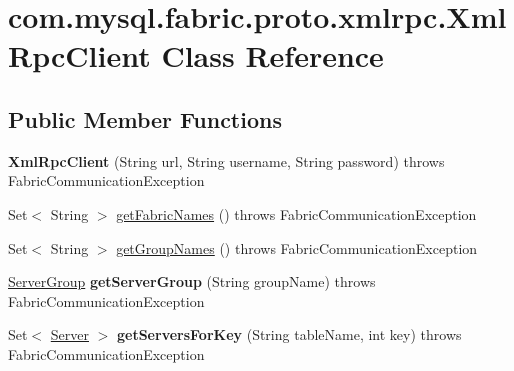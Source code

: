 \hypertarget{classcom_1_1mysql_1_1fabric_1_1proto_1_1xmlrpc_1_1_xml_rpc_client}{}\section{com.\+mysql.\+fabric.\+proto.\+xmlrpc.\+Xml\+Rpc\+Client Class Reference}
\label{classcom_1_1mysql_1_1fabric_1_1proto_1_1xmlrpc_1_1_xml_rpc_client}
\subsection*{Public Member Functions}
\begin{DoxyCompactItemize}
\item 
\mbox{\label{classcom_1_1mysql_1_1fabric_1_1proto_1_1xmlrpc_1_1_xml_rpc_client_aca70274d71b6242a02d406f727f58428}} 
{\bfseries Xml\+Rpc\+Client} (String url, String username, String password)  throws Fabric\+Communication\+Exception 
\item 
Set$<$ String $>$ \mbox{\hyperlink{classcom_1_1mysql_1_1fabric_1_1proto_1_1xmlrpc_1_1_xml_rpc_client_a61a79c49069ab6e664bbca2f37fe7813}{get\+Fabric\+Names}} ()  throws Fabric\+Communication\+Exception 
\item 
Set$<$ String $>$ \mbox{\hyperlink{classcom_1_1mysql_1_1fabric_1_1proto_1_1xmlrpc_1_1_xml_rpc_client_a553477c453b6790f351a0b0b21bf5947}{get\+Group\+Names}} ()  throws Fabric\+Communication\+Exception 
\item 
\mbox{\label{classcom_1_1mysql_1_1fabric_1_1proto_1_1xmlrpc_1_1_xml_rpc_client_ac8a5e74b99defac547d42dcdf8c8e30e}} 
\mbox{\hyperlink{classcom_1_1mysql_1_1fabric_1_1_server_group}{Server\+Group}} {\bfseries get\+Server\+Group} (String group\+Name)  throws Fabric\+Communication\+Exception 
\item 
\mbox{\label{classcom_1_1mysql_1_1fabric_1_1proto_1_1xmlrpc_1_1_xml_rpc_client_a8d9a5ec130ad0fead5583984559ab417}} 
Set$<$ \mbox{\hyperlink{classcom_1_1mysql_1_1fabric_1_1_server}{Server}} $>$ {\bfseries get\+Servers\+For\+Key} (String table\+Name, int key)  throws Fabric\+Communication\+Exception 
\item 

\end{DoxyCompactItemize}
